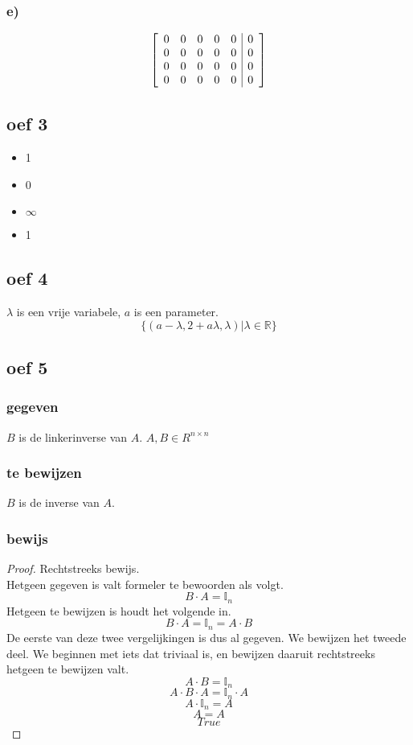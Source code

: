 \documentclass[lineaire_algebra_oplossingen.tex]{subfiles}
\begin{document}
\subsubsection*{e)}
\[
\left[
\begin{array}{l l l l l | r}
0 & 0 & 0 & 0 & 0 & 0\\
0 & 0 & 0 & 0 & 0 & 0\\
0 & 0 & 0 & 0 & 0 & 0\\
0 & 0 & 0 & 0 & 0 & 0\\
\end{array}
\right]
\]

\subsection{oef 3}
\begin{itemize}
\item 1
\item 0
\item $\infty$
\item 1
\end{itemize}

\subsection{oef 4}
$\lambda$ is een vrije variabele, $a$ is een parameter.
\[
\{(a-\lambda, 2+a\lambda, \lambda) | \lambda \in \mathbb{R}\}
\]

\subsection{oef 5}
\subsubsection*{gegeven}
$B$ is de linkerinverse van $A$. $A,B \in R^{n\times n}$
\subsubsection*{te bewijzen}
$B$ is de inverse van $A$.
\subsubsection*{bewijs}
\begin{proof}
Rechtstreeks bewijs.\\
Hetgeen gegeven is valt formeler te bewoorden als volgt.
\[
B\cdot A = \mathbb{I}_n
\]
Hetgeen te bewijzen is houdt het volgende in.
\[
B\cdot A = \mathbb{I}_n = A \cdot B
\]
De eerste van deze twee vergelijkingen is dus al gegeven.
We bewijzen het tweede deel. We beginnen met iets dat triviaal is, en bewijzen daaruit rechtstreeks hetgeen te bewijzen valt.\\
\[A\cdot B = \mathbb{I}_n\]
\[A\cdot B \cdot A = \mathbb{I}_n \cdot A\]
\[A\cdot\mathbb{I}_n = A\]
\[A = A\]
\[True\]
\end{proof}
\end{document}
